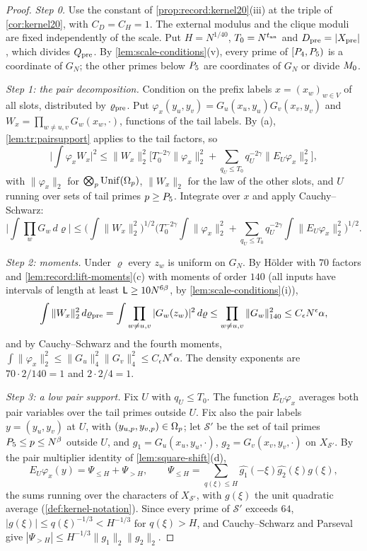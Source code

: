 \begin{proof}
\emph{Step 0.} Use the constant of \cref{prop:record:kernel20}(iii)
at the triple of \cref{cor:kernel20}, with $C_D=C_H=1$. The external
modulus and the clique moduli are fixed independently of the scale. Put $H=N^{1/40}$, $T_0=N^{t_{\rm an}}$ and $D_{\rm pre}=|X_{\rm pre}|$,
which divides $Q_{\rm pre}$. By \cref{lem:scale-conditions}(v), every prime of
$[P_4,P_5)$ is a coordinate of $G_N$; the other primes below $P_5$
are coordinates of $G_N$ or divide $M_0$.

\emph{Step 1: the pair decomposition.} Condition on the prefix labels
$x=(x_w)_{w\in V}$ of all slots, distributed by $\varrho_{\rm pre}$. Put
$\varphi_x(y_u,y_v)=G_u(x_u,y_u)G_v(x_v,y_v)$ and
$W_x=\prod_{w\ne u,v}G_w(x_w,\cdot)$, functions of the tail labels. By (a),
\cref{lem:tr:pairsupport} applies to the tail factors, so
\[
 \Big|\int\varphi_xW_x\Big|^2\le\|W_x\|_2^2\Big[T_0^{-2\gamma}\|\varphi_x\|_2^2
 +\sum_{q_U\le T_0}q_U^{-2\gamma}\|E_U\varphi_x\|_2^2\Big],
\]
with $\|\varphi_x\|_2$ for $\bigotimes_p\operatorname{Unif}(\Omega_{p})$, $\|W_x\|_2$ for the law of
the other slots, and $U$ running over sets of tail primes $p\ge P_5$.
Integrate over $x$ and apply Cauchy--Schwarz:
\[
 \Big|\int\prod_wG_w\,d\varrho\Big|\le\Big(\int\|W_x\|_2^2\Big)^{1/2}
 \Big(T_0^{-2\gamma}\int\|\varphi_x\|_2^2
 +\sum_{q_U\le T_0}q_U^{-2\gamma}\int\|E_U\varphi_x\|_2^2\Big)^{1/2}.
\]

\emph{Step 2: moments.} Under $\varrho$ every $z_w$ is uniform on $G_N$. By
H\"older with $70$ factors and \cref{lem:record:lift-moments}(c) with moments of
order $140$ (all inputs have intervals of length at least
$\mathsf L\ge10N^{6\beta}$, by \cref{lem:scale-conditions}(i)),
\[
 \int\|W_x\|_2^2\,d\varrho_{\rm pre}=\int\prod_{w\ne u,v}|G_w(z_w)|^2\,d\varrho
 \le\prod_{w\ne u,v}\|G_w\|_{140}^2\le C_\epsilon N^\epsilon\alpha ,
\]
and by Cauchy--Schwarz and the fourth moments,
$\int\|\varphi_x\|_2^2\le\|G_u\|_4^2\|G_v\|_4^2\le C_\epsilon N^\epsilon\alpha$.
The density exponents are $70\cdot2/140=1$ and $2\cdot2/4=1$.

\emph{Step 3: a low pair support.} Fix $U$ with $q_U\le T_0$. The function
$E_U\varphi_x$ averages both pair variables over the tail primes outside $U$.
Fix also the pair labels $y=(y_u,y_v)$ at $U$, with
$(y_{u,p},y_{v,p})\in\Omega_{p}$; let $\mathcal S'$ be the set of tail primes
$P_5\le p\le N^\beta$ outside $U$, and $g_1=G_u(x_u,y_u,\cdot)$,
$g_2=G_v(x_v,y_v,\cdot)$ on $X_{\mathcal S'}$. By the pair multiplier
identity of \cref{lem:square-shift}(d),
\[
 E_U\varphi_x(y)=\Psi_{\le H}+\Psi_{>H},\qquad
 \Psi_{\le H}=\sum_{q(\xi)\le H}\widehat{g_1}(-\xi)\widehat{g_2}(\xi)g(\xi),
\]
the sums running over the characters of $X_{\mathcal S'}$, with $g(\xi)$ the
unit quadratic average (\cref{def:kernel-notation}). Since every prime of
$\mathcal S'$ exceeds $64$, $|g(\xi)|\le q(\xi)^{-1/3}<H^{-1/3}$ for
$q(\xi)>H$, and Cauchy--Schwarz and Parseval give
$|\Psi_{>H}|\le H^{-1/3}\|g_1\|_2\|g_2\|_2$.


\end{proof}
